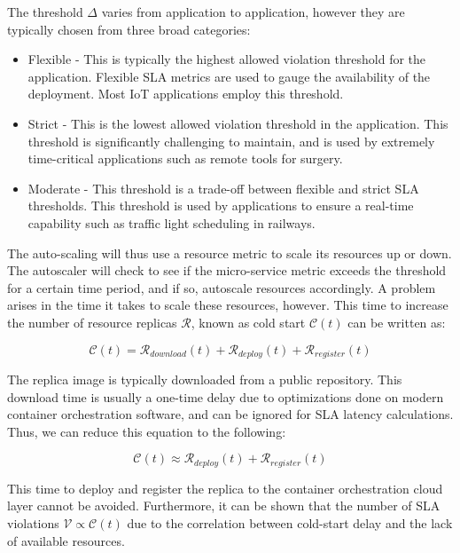 The threshold $\Delta$ varies from application to application, however they are typically chosen from three broad categories:
\begin{itemize}
    \item Flexible - This is typically the highest allowed violation threshold for the application. Flexible SLA metrics are used to gauge the availability of the deployment. Most IoT applications employ this threshold.
    \item Strict - This is the lowest allowed violation threshold in the application. This threshold is significantly challenging to maintain, and is used by extremely time-critical applications such as remote tools for surgery.
    \item Moderate - This threshold is a trade-off between flexible and strict SLA thresholds. This threshold is used by applications to ensure a real-time capability such as traffic light scheduling in railways.
\end{itemize}

The auto-scaling will thus use a resource metric to scale its resources up or down. The autoscaler will check to see if the micro-service metric exceeds the threshold for a certain time period, and if so, autoscale resources accordingly. A problem arises in the time it takes to scale these resources, however. This time to increase the number of resource replicas $\mathcal{R}$, known as cold start $\mathcal{C}(t)$ can be written as:

\begin{equation}
    \mathcal{C}(t) = \mathcal{R}_{download}(t) + \mathcal{R}_{deploy}(t) + \mathcal{R}_{register}(t)
\end{equation}

The replica image is typically downloaded from a public repository. This download time is usually a one-time delay due to optimizations done on modern container orchestration software, and can be ignored for SLA latency calculations. Thus, we can reduce this equation to the following:

\begin{equation}
    \mathcal{C}(t) \approx \mathcal{R}_{deploy}(t) + \mathcal{R}_{register}(t)
\end{equation}


This time to deploy and register the replica to the container orchestration cloud layer cannot be avoided. Furthermore, it can be shown that the number of SLA violations $\mathcal{V} \propto \mathcal{C}(t)$ due to the correlation between cold-start delay and the lack of available resources.\par


